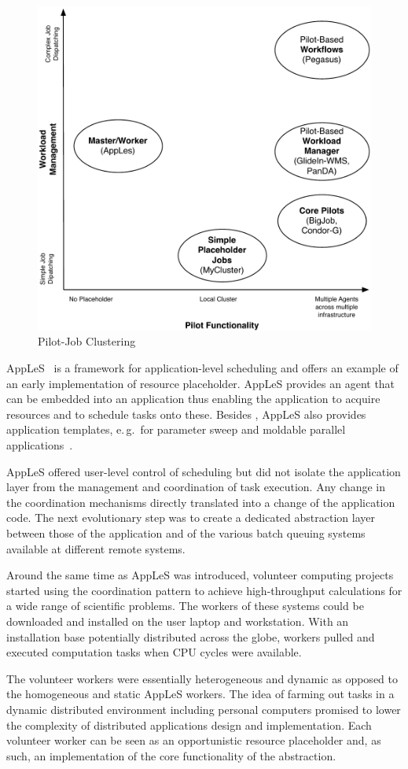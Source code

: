 \documentclass{sig-alternate}
\begin{document}
\begin{figure}[t]
  \centering
    \includegraphics[width=.45\textwidth]{figures/pilotjob-clustering.pdf}
  \caption{Pilot-Job Clustering}
  \label{fig:pilotjob_clustering}
\end{figure}

AppLeS~\cite{Berman:1996:apples} is a framework for application-level scheduling
and offers an example of an early implementation of resource placeholder. AppLeS
provides an agent that can be embedded into an application thus enabling the
application to acquire resources and to schedule tasks onto these. Besides \MW,
AppLeS also provides application templates, e.\,g.\ for parameter sweep and
moldable parallel applications~\cite{Berman:2003:ACG:766629.766632}.

AppLeS offered user-level control of scheduling but did not isolate the
application layer from the management and coordination of task execution. Any
change in the coordination mechanisms directly translated into a change of the
application code. The next evolutionary step was to create a dedicated
abstraction layer between those of the application and of the various batch
queuing systems available at different remote systems.

Around the same time as AppLeS was introduced, volunteer computing projects
started using the \MW coordination pattern to achieve high-throughput
calculations for a wide range of scientific problems. The workers of these
systems could be downloaded and installed on the user laptop and workstation.
With an installation base potentially distributed across the globe, workers
pulled and executed computation tasks when CPU cycles were available.

The volunteer workers were essentially heterogeneous and dynamic as opposed to
the homogeneous and static AppLeS workers. The idea of farming out tasks in a
dynamic distributed environment including personal computers promised to lower
the complexity of distributed applications design and implementation. Each
volunteer worker can be seen as an opportunistic resource placeholder and, as
such, an implementation of the core functionality of the \pilot abstraction.
\end{document}
